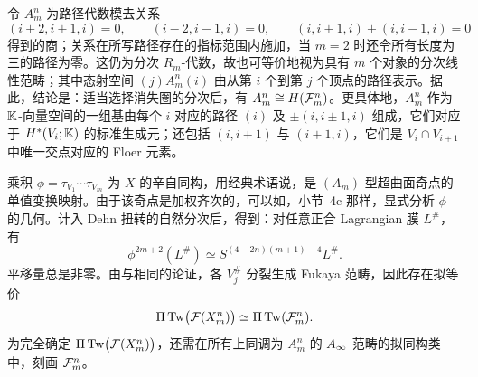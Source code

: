 令 $A_m^n$ 为路径代数模去关系
\[
(i+2,i+1,i)=0,\qquad(i-2,i-1,i)=0,\qquad
(i,i+1,i)+(i,i-1,i)=0
\]
得到的商；关系在所写路径存在的指标范围内施加，当 $m=2$ 时还令所有长度为三的路径为零。这仍为分次 $R_m$-代数，故也可等价地视为具有 $m$ 个对象的分次线性范畴；其中态射空间 $(j)A_m^n(i)$ 由从第 $i$ 个到第 $j$ 个顶点的路径表示。据此，结论是：适当选择消失圈的分次后，有 $A_m^n\cong H(\mathcal F_m^n)$。更具体地，$A_m^n$ 作为 $\mathbb K$-向量空间的一组基由每个 $i$ 对应的路径 $(i)$ 及 $\pm(i,i\pm1,i)$ 组成，它们对应于 $H^*(V_i;\mathbb K)$ 的标准生成元；还包括 $(i,i+1)$ 与 $(i+1,i)$，它们是 $V_i\cap V_{i+1}$ 中唯一交点对应的 Floer 元素。

乘积 $\phi=\tau_{V_1}\cdots\tau_{V_m}$ 为 $X$ 的辛自同构，用经典术语说，是 $(A_m)$ 型超曲面奇点的单值变换映射。由于该奇点是加权齐次的，可以如，小节~4c 那样，显式分析 $\phi$ 的几何。计入 Dehn 扭转的自然分次后，得到：对任意正合 Lagrangian 膜 $L^\#$，有
\[
\phi^{2m+2}(L^\#)\simeq S^{(4-2n)(m+1)-4}L^\#.
\]
平移量总是非零。由与相同的论证，各 $V_j^\#$ 分裂生成 Fukaya 范畴，因此存在拟等价
\begin{equation}\label{eq:20.3}
\Pi\operatorname{Tw}\bigl(\mathcal F(X_m^n)\bigr)\simeq\Pi\operatorname{Tw}(\mathcal F_m^n).
\end{equation}
为完全确定 $\Pi\operatorname{Tw}\bigl(\mathcal F(X_m^n)\bigr)$，还需在所有上同调为 $A_m^n$ 的 $A_\infty$ 范畴的拟同构类中，刻画 $\mathcal F_m^n$。
